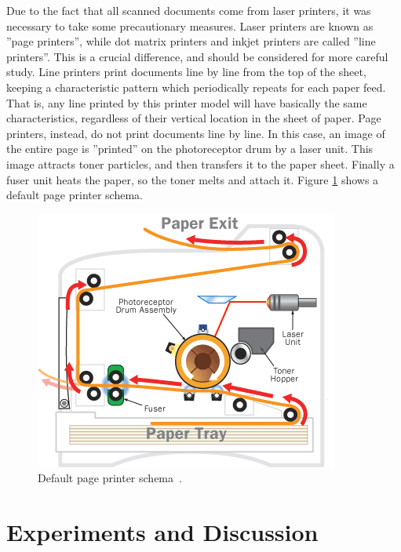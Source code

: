 \documentclass[10pt,twocolumn,letterpaper]{article}
\begin{document}
Due to the fact that all scanned documents come from laser printers, it was necessary to take some precautionary measures. Laser printers are known as ''page printers'', while dot matrix printers and inkjet printers are called ''line printers''. This is a crucial difference, and should be considered for more careful study. Line printers print documents line by line from the top of the sheet, keeping a characteristic pattern which periodically repeats for each paper feed. That is, any line printed by this printer model will have basically the same characteristics, regardless of their vertical location in the sheet of paper. Page printers, instead, do not print documents line by line. In this case, an image of the entire page is ''printed'' on the photoreceptor drum by a laser unit. This image attracts toner particles, and then transfers it to the paper sheet. Finally a fuser unit heats the paper, so the toner melts and attach it. Figure \ref{fig:page_printer} shows a default page printer schema.

\begin{figure}
\begin{center}
	\includegraphics[width=0.99\columnwidth]{page_printer}
	\caption{Default page printer schema~\cite{Document_Analysis}.}
\label{fig:page_printer}   
\end{center} 
\end{figure}

\section{Experiments and Discussion}
\end{document}
